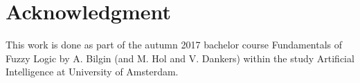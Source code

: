 \documentclass[journal]{IEEEtran}
\begin{document}

\section{Acknowledgment}

This work is done as part of the autumn 2017 bachelor course Fundamentals of Fuzzy Logic by A. Bilgin (and  M. Hol and V. Dankers) within the study Artificial Intelligence at University of Amsterdam.
\end{document}
